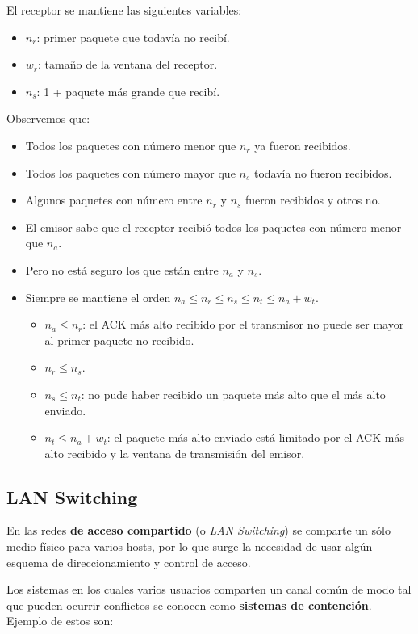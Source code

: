 \documentclass[]{article}
\begin{document}
El receptor se mantiene las siguientes variables:
\begin{itemize}
    \item $n_r$: primer paquete que todavía no recibí.
    \item $w_r$: tamaño de la ventana del receptor.
    \item $n_s$: 1 + paquete más grande que recibí.
\end{itemize}

Observemos que:
\begin{itemize}
    \item Todos los paquetes con número menor que $n_r$ ya fueron recibidos.
    \item Todos los paquetes con número mayor que $n_s$ todavía no fueron recibidos.
    \item Algunos paquetes con número entre $n_r$ y $n_s$ fueron recibidos y otros no.
    \item El emisor sabe que el receptor recibió todos los paquetes con número menor que $n_a$.
    \item Pero no está seguro los que están entre $n_a$ y $n_s$.
    \item Siempre se mantiene el orden $n_a \leq n_r \leq n_s \leq n_t \leq n_a + w_t$.
    \begin{itemize}
        \item $n_a \leq n_r$: el ACK más alto recibido por el transmisor no puede ser mayor al primer paquete no recibido.
        \item $n_r \leq n_s$.
        \item $n_s \leq n_t$: no pude haber recibido un paquete más alto que el más alto enviado.
        \item $n_t \leq n_a+w_t$: el paquete más alto enviado está limitado por el ACK más alto recibido y la ventana de transmisión del emisor.
    \end{itemize}
\end{itemize}


\subsection{LAN Switching}
En las redes \textbf{de acceso compartido} (o \emph{LAN Switching}) se comparte un sólo medio físico para varios hosts, por lo que surge la necesidad de usar algún esquema de direccionamiento y control de acceso.

Los sistemas en los cuales varios usuarios comparten un canal común de modo tal que pueden ocurrir conflictos se conocen como \textbf{sistemas de contención}. Ejemplo de estos son:
\end{document}

